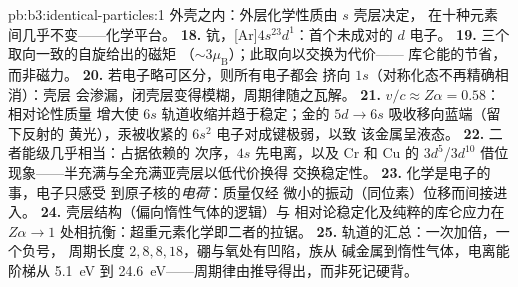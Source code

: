 \begin{solution}{pb:b3:identical-particles:1}
外壳之内：外层化学性质由 $s$ 壳层决定，
在十种元素间几乎不变——化学平台。
\textbf{18.} 钪，[Ar]$4s^23d^1$：首个未成对的 $d$
电子。
\textbf{19.} 三个取向一致的自旋给出的磁矩
（$\sim3\mu_{\text{B}}$）；此取向以交换为代价——
库仑能的节省，而非磁力。
\textbf{20.} 若电子略可区分，则所有电子都会
挤向 $1s$（对称化态不再精确相消）：壳层
会渗漏，闭壳层变得模糊，周期律随之瓦解。
\textbf{21.} $v/c \approx Z\alpha = 0.58$：相对论性质量
增大使 $6s$ 轨道收缩并趋于稳定；金的
$5d \to 6s$ 吸收移向蓝端（留下反射的
黄光），汞被收紧的 $6s^2$ 电子对成键极弱，以致
该金属呈液态。
\textbf{22.} 二者能级几乎相当：占据依赖的
次序，$4s$ 先电离，以及 Cr 和 Cu 的 $3d^5$/$3d^{10}$ 借位
现象——半充满与全充满亚壳层以低代价换得
交换稳定性。
\textbf{23.} 化学是电子的事，电子只感受
到原子核的\emph{电荷}：质量仅经
微小的振动（同位素）位移而间接进入。
\textbf{24.} 壳层结构（偏向惰性气体的逻辑）与
相对论稳定化及纯粹的库仑应力在
$Z\alpha \to 1$ 处相抗衡：超重元素化学即二者的拉锯。
\textbf{25.} 轨道的汇总：一次加倍，一个负号，
周期长度 $2, 8, 8, 18$，硼与氧处有凹陷，族从
碱金属到惰性气体，电离能阶梯从 \qty{5.1}{eV} 到
\qty{24.6}{eV}——周期律由推导得出，而非死记硬背。
\end{solution}
